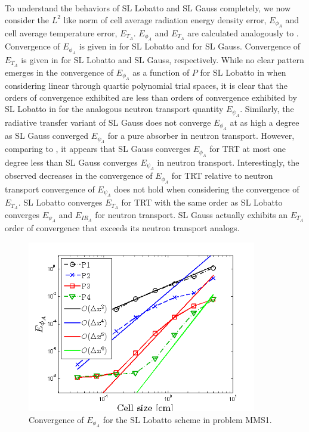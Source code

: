 To understand the behaviors of SL Lobatto and SL Gauss completely, we now consider the $L^2$ like norm of cell average radiation energy density error, $E_{\phi_A}$ and cell average temperature error, $E_{T_A}$.
$E_{\phi_A}$ and $E_{T_A}$ are calculated analogously to .
Convergence of $E_{\phi_A}$ is given in  for SL Lobatto and  for SL Gauss.
Convergence of $E_{T_A}$ is given in  for SL Lobatto and SL Gauss, respectively.
While no clear pattern emerges in the convergence of $E_{\phi_A}$ as a function of $P$ for SL Lobatto in  when considering linear through quartic polynomial trial spaces, it is clear that the orders of convergence exhibited are less than orders of convergence exhibited by SL Lobatto in  for the analogous neutron transport quantity $E_{\psi_A}$.
Similarly, the radiative transfer variant of SL Gauss does not converge $E_{\phi_A}$ at as high a degree as SL Gauss converged $E_{\psi_A}$ for a pure absorber in neutron transport.  
However, comparing  to , it appears that SL Gauss converges $E_{\phi_A}$ for TRT at most one degree less than SL Gauss converges $E_{\psi_A}$ in neutron transport. 
Interestingly, the observed decreases in the convergence of $E_{\phi_A}$ for TRT relative to neutron transport convergence of $E_{\psi_A}$ does not hold when considering the convergence of$E_{T_A}$.  
SL Lobatto converges $E_{T_A}$ for TRT with the same order as SL Lobatto converges $E_{\psi_A}$ and $E_{IR_A}$ for neutron transport.
SL Gauss actually exhibits an $E_{T_A}$ order of convergence that exceeds its neutron transport analogs. 
\begin{figure}[!ht]
\centering
\includegraphics[width=10cm]{chapter6_grey_radtran/Dissertation_Data/MMS2_SLXS_Lobatto_phi_A.png}
\caption{Convergence of $E_{\phi_A}$ for the SL Lobatto scheme in problem MMS1.}
\label{fig:mms1_lobatto_phi_A}
\end{figure}
